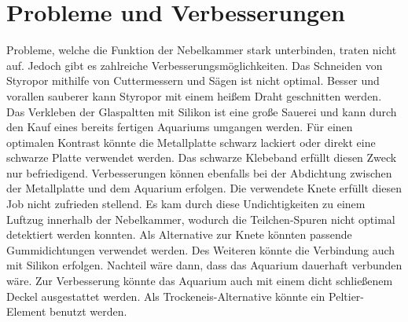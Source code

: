 \section{Probleme und Verbesserungen}
Probleme, welche die Funktion der Nebelkammer stark unterbinden, traten nicht
auf. Jedoch gibt es zahlreiche Verbesserungsmöglichkeiten. Das Schneiden von
Styropor mithilfe von Cuttermessern und Sägen ist nicht optimal. Besser und
vorallen sauberer kann Styropor mit einem heißem Draht geschnitten werden. Das
Verkleben der Glaspaltten mit Silikon ist eine große Sauerei und kann durch den
Kauf eines bereits fertigen Aquariums umgangen werden. Für einen optimalen
Kontrast könnte die Metallplatte schwarz lackiert oder direkt eine schwarze
Platte verwendet werden. Das schwarze Klebeband erfüllt diesen Zweck nur
befriedigend. Verbesserungen können ebenfalls bei der Abdichtung zwischen der
Metallplatte und dem Aquarium erfolgen. Die verwendete Knete erfüllt diesen Job
nicht zufrieden stellend. Es kam durch diese Undichtigkeiten zu einem Luftzug
innerhalb der Nebelkammer, wodurch die Teilchen-Spuren nicht optimal detektiert
werden konnten. Als Alternative zur Knete könnten passende Gummidichtungen
verwendet werden. Des Weiteren könnte die Verbindung auch mit Silikon erfolgen.
Nachteil wäre dann, dass das Aquarium dauerhaft verbunden wäre. Zur Verbesserung
könnte das Aquarium auch mit einem dicht schließenem Deckel ausgestattet werden.
Als Trockeneis-Alternative könnte ein Peltier-Element benutzt werden.


